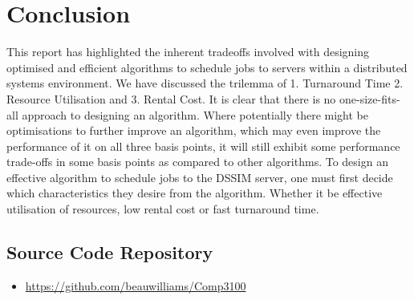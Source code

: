 \documentclass[a4paper]{article} %
\begin{document}
\section*{Conclusion}
This report has highlighted the inherent tradeoffs involved with designing optimised and efficient algorithms to schedule jobs to servers within a distributed systems environment. We have discussed the trilemma of 1. Turnaround Time 2. Resource Utilisation and 3. Rental Cost. It is clear that there is no one-size-fits-all approach to designing an algorithm. Where potentially there might be optimisations to further improve an algorithm, which may even improve the performance of it on all three basis points, it will still exhibit some performance trade-offs in some basis points as compared to other algorithms. To design an effective algorithm to schedule jobs to the DSSIM server, one must first decide which characteristics they desire from the algorithm. Whether it be effective utilisation of resources, low rental cost or fast turnaround time. 

\subsection*{Source Code Repository}
\begin{itemize}
    \item \hyperlink{https://github.com/beauwilliams/Comp3100}{https://github.com/beauwilliams/Comp3100}
\end{itemize}




\end{document}
